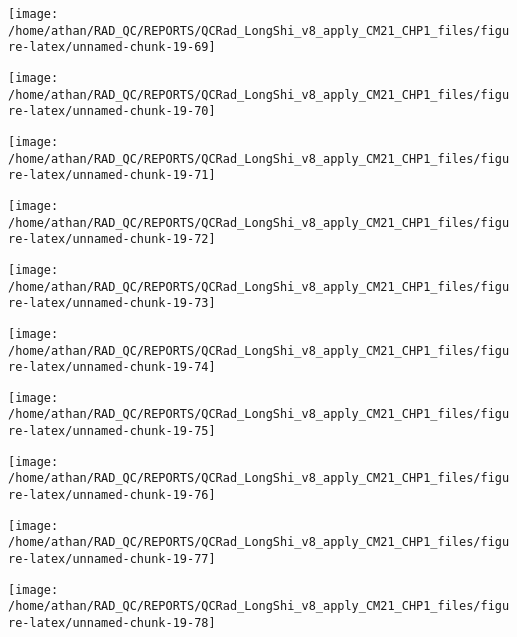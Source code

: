 \documentclass[
  10pt,
  a4paper,oneside]{article}
\begin{document}
\begin{center}\texttt{[image: /home/athan/RAD\_QC/REPORTS/QCRad\_LongShi\_v8\_apply\_CM21\_CHP1\_files/figure-latex/unnamed-chunk-19-69]} \end{center}

\begin{center}\texttt{[image: /home/athan/RAD\_QC/REPORTS/QCRad\_LongShi\_v8\_apply\_CM21\_CHP1\_files/figure-latex/unnamed-chunk-19-70]} \end{center}

\begin{center}\texttt{[image: /home/athan/RAD\_QC/REPORTS/QCRad\_LongShi\_v8\_apply\_CM21\_CHP1\_files/figure-latex/unnamed-chunk-19-71]} \end{center}

\begin{center}\texttt{[image: /home/athan/RAD\_QC/REPORTS/QCRad\_LongShi\_v8\_apply\_CM21\_CHP1\_files/figure-latex/unnamed-chunk-19-72]} \end{center}

\begin{center}\texttt{[image: /home/athan/RAD\_QC/REPORTS/QCRad\_LongShi\_v8\_apply\_CM21\_CHP1\_files/figure-latex/unnamed-chunk-19-73]} \end{center}

\begin{center}\texttt{[image: /home/athan/RAD\_QC/REPORTS/QCRad\_LongShi\_v8\_apply\_CM21\_CHP1\_files/figure-latex/unnamed-chunk-19-74]} \end{center}

\begin{center}\texttt{[image: /home/athan/RAD\_QC/REPORTS/QCRad\_LongShi\_v8\_apply\_CM21\_CHP1\_files/figure-latex/unnamed-chunk-19-75]} \end{center}

\begin{center}\texttt{[image: /home/athan/RAD\_QC/REPORTS/QCRad\_LongShi\_v8\_apply\_CM21\_CHP1\_files/figure-latex/unnamed-chunk-19-76]} \end{center}

\begin{center}\texttt{[image: /home/athan/RAD\_QC/REPORTS/QCRad\_LongShi\_v8\_apply\_CM21\_CHP1\_files/figure-latex/unnamed-chunk-19-77]} \end{center}

\begin{center}\texttt{[image: /home/athan/RAD\_QC/REPORTS/QCRad\_LongShi\_v8\_apply\_CM21\_CHP1\_files/figure-latex/unnamed-chunk-19-78]} \end{center}
\end{document}
